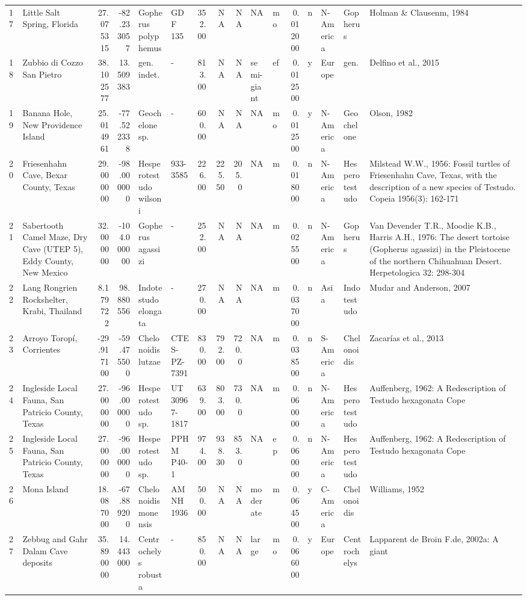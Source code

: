 \documentclass[]{article}
\begin{document}
\begin{longtable}[]{@{}llrrllrrrllrllll@{}}
17 & Little Salt Spring, Florida & 27.075315 & -82.233057 & Gopherus
polyphemus & GDF 135 & 352.00 & NA & NA & NA & mo & 0.012000 & n &
N-America & Gopherus & Holman \& Clausenm, 1984\tabularnewline
18 & Zubbio di Cozzo San Pietro & 38.102577 & 13.509383 & gen. indet. &
- & 813.00 & NA & NA & semi-giant & ef & 0.012500 & y & Europe & gen. &
Delfino et al., 2015\tabularnewline
19 & Banana Hole, New Providence Island & 25.014961 & -77.522338 &
Geochelone sp. & - & 600.00 & NA & NA & NA & mo & 0.012500 & y &
N-America & Geochelone & Olson, 1982\tabularnewline
20 & Friesenhahn Cave, Bexar County, Texas & 29.000000 & -98.000000 &
Hesperotestudo wilsoni & 933-3585 & 226.00 & 225.50 & 205.0 & NA & m &
0.018000 & n & N-America & Hesperotestudo & Milstead W.W., 1956: Fossil
turtles of Friesenhahn Cave, Texas, with the description of a new
species of Testudo. Copeia 1956(3): 162-171\tabularnewline
21 & Sabertooth Camel Maze, Dry Cave (UTEP 5), Eddy County, New Mexico &
32.000000 & -104.000000 & Gopherus agassizi & - & 252.00 & NA & NA & NA
& m & 0.025500 & n & N-America & Gopherus & Van Devender T.R., Moodie
K.B., Harris A.H., 1976: The desert tortoise (Gopherus agassizi) in the
Pleistocene of the northern Chihuahuan Desert. Herpetologica 32:
298-304\tabularnewline
22 & Lang Rongrien Rockshelter, Krabi, Thailand & 8.179722 & 98.880556 &
Indotestudo elongata & - & 270.00 & NA & NA & NA & m & 0.037000 & n &
Asia & Indotestudo & Mudar and Anderson, 2007\tabularnewline
23 & Arroyo Toropí, Corrientes & -29.917100 & -59.475500 & Chelonoidis
lutzae & CTES-PZ-7391 & 830.00 & 792.00 & 720.0 & NA & m & 0.038500 & n
& S-America & Chelonoidis & Zacarías et al., 2013\tabularnewline
24 & Ingleside Local Fauna, San Patricio County, Texas & 27.000000 &
-96.000000 & Hesperotestudo sp. & UT 30967-1817 & 639.00 & 803.00 &
730.0 & NA & m & 0.060000 & n & N-America & Hesperotestudo & Auffenberg,
1962: A Redescription of Testudo hexagonata Cope\tabularnewline
25 & Ingleside Local Fauna, San Patricio County, Texas & 27.000000 &
-96.000000 & Hesperotestudo sp. & PPHM P40-1 & 974.00 & 938.30 & 853.0 &
NA & ep & 0.060000 & n & N-America & Hesperotestudo & Auffenberg, 1962:
A Redescription of Testudo hexagonata Cope\tabularnewline
26 & Mona Island & 18.087000 & -67.889200 & Chelonoidis monensis & AMNH
1936 & 500.00 & NA & NA & moderate & m & 0.064500 & y & C-America &
Chelonoidis & Williams, 1952\tabularnewline
27 & Zebbug and Gahr Dalam Cave deposits & 35.890000 & 14.443000 &
Centrochelys robusta & - & 850.00 & NA & NA & large & mo & 0.066000 & y
& Europe & Centrochelys & Lapparent de Broin F.de, 2002a: A giant

\end{longtable}
\end{document}
